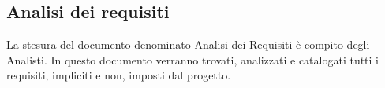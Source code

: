 %
%
%
%
%

\subsection{Analisi dei requisiti}
\label{6.1}
La stesura del documento denominato Analisi dei Requisiti è compito degli Analisti.
In questo documento verranno trovati, analizzati e catalogati tutti i requisiti, impliciti e non, imposti dal progetto.

